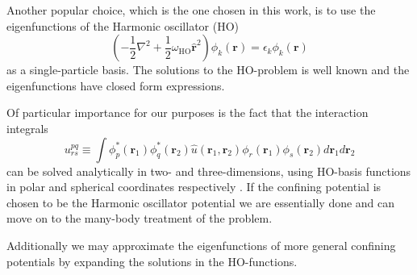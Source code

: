\documentclass[aip,jcp,reprint,floatfix]{revtex4-1}
\begin{document}
Another popular choice, which is the one chosen in this work, is to
use the eigenfunctions of the Harmonic oscillator (HO)
\begin{equation}
 \left(-\frac{1}{2}\nabla^2 + \frac{1}{2} \omega_{\text{HO}}\hat{\mathbf{r}}^2 \right) \phi_k(\mathbf{r}) = \epsilon_k \phi_k(\mathbf{r})  
\end{equation}
as a single-particle basis. The solutions to the HO-problem is well
known and the eigenfunctions have closed form expressions.

Of particular importance for our purposes is the fact that the
interaction integrals
\begin{equation}
 u^{pq}_{rs} \equiv \int \phi^*_p(\mathbf{r}_1) \phi^*_q(\mathbf{r}_2) \hat{u}(\mathbf{r}_1,\mathbf{r}_2) \phi_r(\mathbf{r}_1)\phi_s(\mathbf{r}_2) d\mathbf{r}_1 d\mathbf{r}_2
\end{equation}
can be solved analytically in two- and three-dimensions, using
HO-basis functions in polar and spherical coordinates respectively
\cite{Anisimovas98, Vorrath2003}. If the confining potential is chosen
to be the Harmonic oscillator potential we are essentially done and
can move on to the many-body treatment of the problem.

Additionally we may approximate the eigenfunctions of more general
confining potentials by expanding the solutions in the HO-functions.
\end{document}

